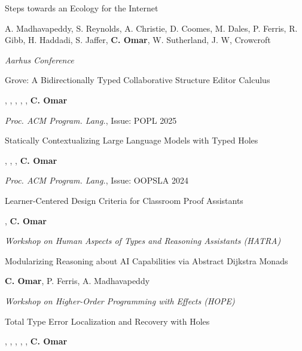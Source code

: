 \documentclass[10pt,letterpaper]{article}
\renewenvironment{itemize}{
  \begin{list}{}{
    \setlength{\leftmargin}{1.25em}
    \setlength{\itemsep}{0.25em}
    \setlength{\parskip}{0pt}
    \setlength{\parsep}{0.2em}
  }
}{
  \end{list}
}
\begin{document}
\begin{enumerate}[leftmargin=*, labelindent=6.5em, font=\bfseries]
  \item[Aarhus 2025]{Steps towards an Ecology for the Internet}
  \begin{itemize}
    \item A. Madhavapeddy, S. Reynolds, A. Christie, D. Coomes, M. Dales, P. Ferris, R. Gibb, H. Haddadi, S. Jaffer, 
    \textbf{C. Omar}, W. Sutherland, J. W, Crowcroft
    \item \textit{Aarhus Conference}
  \end{itemize}
  \item[POPL 2025]{Grove: A Bidirectionally Typed Collaborative Structure Editor Calculus}
  \begin{itemize}
    \item {}, , , , , \textbf{C. Omar}
    \item \textit{Proc. ACM Program. Lang.}, Issue: POPL 2025
  \end{itemize}
  \item[OOPSLA 2024]{Statically Contextualizing Large Language Models with Typed Holes}
  \begin{itemize}
    \item {}, , , \textbf{C. Omar}
    \item \textit{Proc. ACM Program. Lang.}, Issue: OOPSLA 2024
  \end{itemize}
  \item[HATRA 2024]{Learner-Centered Design Criteria for Classroom Proof Assistants}
  \begin{itemize}
    \item {}, \textbf{C. Omar}
    \item \textit{Workshop on Human Aspects of Types and Reasoning Assistants (HATRA)}
  \end{itemize}
  \item[HOPE 2024]{Modularizing Reasoning about AI Capabilities via Abstract Dijkstra Monads}
  \begin{itemize}
    \item \textbf{C. Omar}, P. Ferris, A. Madhavapeddy
    \item \textit{Workshop on Higher-Order Programming with Effects (HOPE)}
  \end{itemize}
  \item[POPL 2024] {Total Type Error Localization and Recovery with Holes}
  \begin{itemize}
    \item {}, , , , , \textbf{C. Omar}

\end{itemize}
\end{enumerate}
\end{document}
